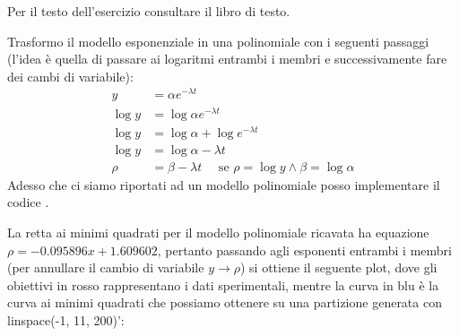\begin{exercise}[4.22] 
Per il testo dell'esercizio consultare il libro di testo. 
\end{exercise}
Trasformo il modello esponenziale in una polinomiale con i seguenti passaggi
(l'idea \`e quella di passare ai logaritmi entrambi i membri e successivamente
fare dei cambi di variabile):
\begin{displaymath}
\begin{split}
y &= \alpha e^{-\lambda t}\\
\log{y} &= \log{\alpha e^{-\lambda t}}\\
\log{y} &= \log{\alpha} +  \log{e^{-\lambda t}}\\
\log{y} &= \log{\alpha} -\lambda t\\
\rho &= \beta -\lambda t \quad \text{ se } \rho = \log{y} \wedge \beta =
\log{\alpha}
\end{split}
\end{displaymath}
Adesso che ci siamo riportati ad un modello polinomiale posso implementare
il codice . 

La retta ai minimi quadrati per il modello polinomiale ricavata ha equazione
$\rho = -0.095896x + 1.609602$, pertanto passando agli esponenti entrambi i
membri (per annullare il cambio di variabile $y \rightarrow \rho$) si ottiene il
seguente plot, dove gli obiettivi in rosso rappresentano i dati sperimentali, 
mentre la curva in blu \`e la curva ai minimi quadrati che possiamo ottenere  su
una partizione generata con \textsf{linspace(-1, 11, 200)'}:
\begin{center}

\end{center}



